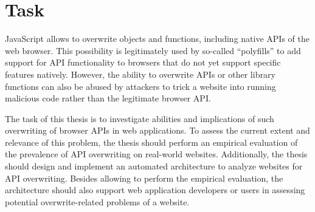 \chapter*{Task}

JavaScript allows to overwrite objects and functions, including native APIs of the web browser. This possibility is legitimately used by so-called “polyfills” to add support for API functionality to browsers that do not yet support specific features natively. However, the ability to overwrite APIs or other library functions can also be abused by attackers to trick a website into running malicious code rather than the legitimate browser API\@.

The task of this thesis is to investigate abilities and implications of such overwriting of browser APIs in web applications. To assess the current extent and relevance of this problem, the thesis should perform an empirical evaluation of the prevalence of API overwriting on real-world websites. Additionally, the thesis should design and implement an automated architecture to analyze websites for API overwriting. Besides allowing to perform the empirical evaluation, the architecture should also support web application developers or users in assessing potential overwrite-related problems of a website.

